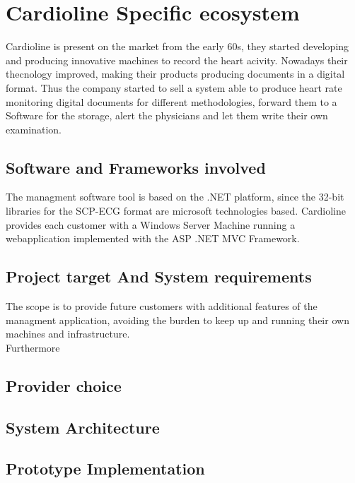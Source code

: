 \chapter{Cardioline Specific ecosystem}
Cardioline is present on the market from the early 60s, they started developing and producing innovative machines to record the heart acivity. Nowadays their thecnology improved, making their products producing documents in a digital format.
Thus the company started to sell a system able to produce heart rate monitoring digital documents for different methodologies, forward them to a Software for the storage, alert the physicians and let them write their own examination.
\section{Software and Frameworks involved}
The managment software tool is based on the .NET platform, since the 32-bit libraries for the SCP-ECG format are microsoft technologies based.
Cardioline provides each customer with a Windows Server Machine running a webapplication implemented with the ASP .NET MVC Framework.
\section{Project target And System requirements}
The scope is to provide future customers with additional features of the managment application, avoiding the burden to keep up and running their own machines and infrastructure.\\
Furthermore 
\section{Provider choice}
\section{System Architecture}
\section{Prototype Implementation}